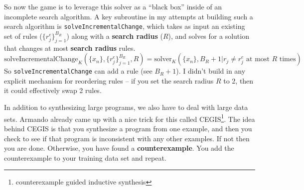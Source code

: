 \documentclass{article}
\begin{document}
So now the game is to leverage this solver as a ``black box'' inside of an incomplete search algorithm.
A key subroutine in my attempts at building such a search algorithm is
\texttt{solveIncrementalChange}, which takes as input an existing set of rules ($\{r_j^e\}_{j = 1}^{B_R}$)
along with a \textbf{search radius} ($R$),
and solves for a solution that changes at most \textbf{search radius} rules.
\begin{equation}
  \text{solveIncrementalChange}_K (\{x_n\}, \{r_j^e\}_{j = 1}^{B_R}, R)
   = \text{solver}_K (\{x_n\}, B_R+1 | r_j\not= r_j^e \text{ at most }R\text{ times})
\end{equation}
So \texttt{solveIncrementalChange} can add a rule (see $B_R+1$). I didn't build in any explicit mechanism for reordering rules -- if you set the search radius $R$ to 2, then it could effectively swap 2 rules.

In addition to synthesizing large programs, we also have to deal with
large data sets. Armando already came up with a nice trick for this called CEGIS\footnote{counterexample
  guided inductive synthesis}.
The idea behind CEGIS is that you synthesize a program from one example,
and then you check to see if that program is inconsistent with any other examples.
If not then you are done.
Otherwise, you have found a \textbf{counterexample}. You add the counterexample to your
training data set and repeat.
\end{document}
